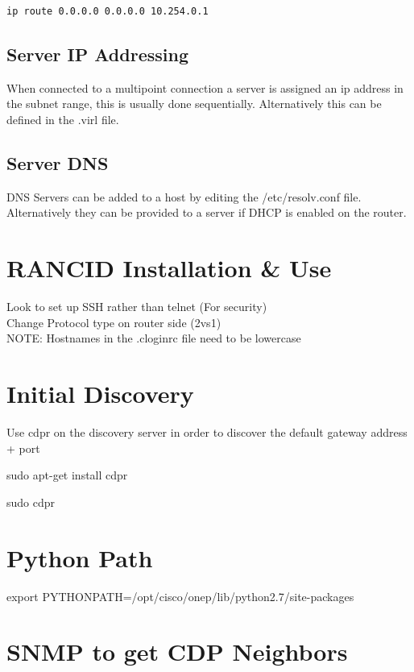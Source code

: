 \documentclass[11pt]{report}
\begin{document}
\begin{lstlisting}
ip route 0.0.0.0 0.0.0.0 10.254.0.1
\end{lstlisting}

\subsection*{Server IP Addressing}

When connected to a multipoint connection a server is assigned an ip address in the subnet range, this is usually done sequentially. Alternatively this can be defined in the .virl file.

\subsection*{Server DNS}

DNS Servers can be added to a host by editing the /etc/resolv.conf file. Alternatively they can be provided to a server if DHCP is enabled on the router.

\section*{RANCID Installation \& Use}

Look to set up SSH rather than telnet (For security)
\\
Change Protocol type on router side (2vs1)
\\
NOTE: Hostnames in the .cloginrc file need to be lowercase

\section*{Initial Discovery}

Use cdpr on the discovery server in order to discover the default gateway address + port

sudo apt-get install cdpr

sudo cdpr

\section*{Python Path}

 export PYTHONPATH=/opt/cisco/onep/lib/python2.7/site-packages
 
\section*{SNMP to get CDP Neighbors}
\end{document}
